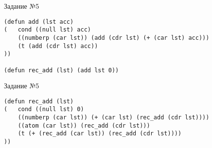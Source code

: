 \begin{code}
\caption{Задание №5}
\label{code:bf5}
\begin{verbatim}
(defun add (lst acc)
(	cond ((null lst) acc)
	((numberp (car lst)) (add (cdr lst) (+ (car lst) acc)))
	(t (add (cdr lst) acc))
))

(defun rec_add (lst) (add lst 0))
\end{verbatim}
\end{code}

\begin{code}
\caption{Задание №5}
\label{code:bf5}
\begin{verbatim}
(defun rec_add (lst)
(	cond ((null lst) 0)
	((numberp (car lst)) (+ (car lst) (rec_add (cdr lst))))
	((atom (car lst)) (rec_add (cdr lst)))
	(t (+ (rec_add (car lst)) (rec_add (cdr lst))))
))
\end{verbatim}
\end{code}
